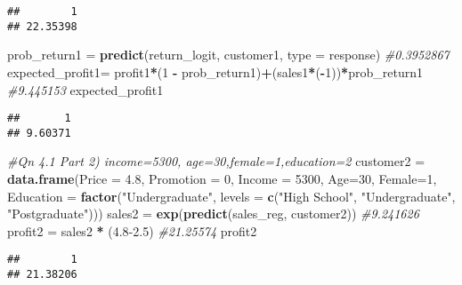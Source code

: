 \documentclass[
]{article}
\newenvironment{Shaded}{\begin{snugshade}}{\end{snugshade}}
\newcommand{\AttributeTok}[1]{\textcolor[rgb]{0.13,0.29,0.53}{#1}}
\newcommand{\CommentTok}[1]{\textcolor[rgb]{0.56,0.35,0.01}{\textit{#1}}}
\newcommand{\DecValTok}[1]{\textcolor[rgb]{0.00,0.00,0.81}{#1}}
\newcommand{\FloatTok}[1]{\textcolor[rgb]{0.00,0.00,0.81}{#1}}
\newcommand{\FunctionTok}[1]{\textcolor[rgb]{0.13,0.29,0.53}{\textbf{#1}}}
\newcommand{\NormalTok}[1]{#1}
\newcommand{\OtherTok}[1]{\textcolor[rgb]{0.56,0.35,0.01}{#1}}
\newcommand{\SpecialCharTok}[1]{\textcolor[rgb]{0.81,0.36,0.00}{\textbf{#1}}}
\newcommand{\StringTok}[1]{\textcolor[rgb]{0.31,0.60,0.02}{#1}}
\begin{document}
\begin{verbatim}
##        1 
## 22.35398
\end{verbatim}

\begin{Shaded}
\begin{Highlighting}[]
\NormalTok{prob\_return1 }\OtherTok{=} \FunctionTok{predict}\NormalTok{(return\_logit, customer1, }\AttributeTok{type =} \StringTok{\textquotesingle{}response\textquotesingle{}}\NormalTok{) }\CommentTok{\#0.3952867 }
\NormalTok{expected\_profit1}\OtherTok{=}\NormalTok{ profit1}\SpecialCharTok{*}\NormalTok{(}\DecValTok{1} \SpecialCharTok{{-}}\NormalTok{ prob\_return1)}\SpecialCharTok{+}\NormalTok{(sales1}\SpecialCharTok{*}\NormalTok{(}\SpecialCharTok{{-}}\DecValTok{1}\NormalTok{))}\SpecialCharTok{*}\NormalTok{prob\_return1 }\CommentTok{\#9.445153 }
\NormalTok{expected\_profit1}
\end{Highlighting}
\end{Shaded}

\begin{verbatim}
##       1 
## 9.60371
\end{verbatim}

\begin{Shaded}
\begin{Highlighting}[]
\CommentTok{\#Qn 4.1 Part 2) income=5300, age=30,female=1,education=2}
\NormalTok{customer2 }\OtherTok{=} \FunctionTok{data.frame}\NormalTok{(}\AttributeTok{Price =} \FloatTok{4.8}\NormalTok{, }\AttributeTok{Promotion =} \DecValTok{0}\NormalTok{, }\AttributeTok{Income =} \DecValTok{5300}\NormalTok{, }\AttributeTok{Age=}\DecValTok{30}\NormalTok{, }\AttributeTok{Female=}\DecValTok{1}\NormalTok{, }\AttributeTok{Education =} \FunctionTok{factor}\NormalTok{(}\StringTok{"Undergraduate"}\NormalTok{, }\AttributeTok{levels =} \FunctionTok{c}\NormalTok{(}\StringTok{"High School"}\NormalTok{, }\StringTok{"Undergraduate"}\NormalTok{, }\StringTok{"Postgraduate"}\NormalTok{)))}
\NormalTok{sales2 }\OtherTok{=} \FunctionTok{exp}\NormalTok{(}\FunctionTok{predict}\NormalTok{(sales\_reg, customer2)) }\CommentTok{\#9.241626 }
\NormalTok{profit2 }\OtherTok{=}\NormalTok{ sales2 }\SpecialCharTok{*}\NormalTok{ (}\FloatTok{4.8{-}2.5}\NormalTok{) }\CommentTok{\#21.25574 }
\NormalTok{profit2}
\end{Highlighting}
\end{Shaded}

\begin{verbatim}
##        1 
## 21.38206
\end{verbatim}
\end{document}
